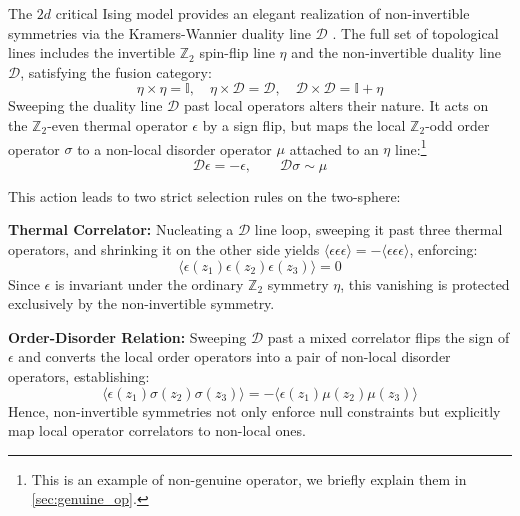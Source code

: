 \documentclass[aps,preprint,nofootinbib,preprintnumbers,eqsecnum,superscriptaddress]{revtex4}
\numberwithin{equation}{section}
\begin{document}
\begin{tcolorbox}[colback=green!5!white, colframe=green!75!black, title={Example: The $2d$ Critical Ising Model and Selection Rules}]
The $2d$ critical Ising model provides an elegant realization of non-invertible symmetries via the Kramers-Wannier duality line $\mathcal{D}$ \cite{shao2024whatsundonetasilectures}. The full set of topological lines includes the invertible $\mathbb{Z}_2$ spin-flip line $\eta$ and the non-invertible duality line $\mathcal{D}$, satisfying the fusion category:
\begin{equation}
    \eta \times \eta = \mathbb{I}, \quad \eta \times \mathcal{D} = \mathcal{D}, \quad \mathcal{D} \times \mathcal{D} = \mathbb{I} + \eta
\end{equation}
Sweeping the duality line $\mathcal{D}$ past local operators alters their nature. It acts on the $\mathbb{Z}_2$-even thermal operator $\epsilon$ by a sign flip, but maps the local $\mathbb{Z}_2$-odd order operator $\sigma$ to a non-local disorder operator $\mu$ attached to an $\eta$ line:\footnote{This is an example of non-genuine operator, we briefly explain them in \ref{sec:genuine_op}.}
\begin{equation}
    \mathcal{D}\epsilon = -\epsilon, \qquad \mathcal{D}\sigma \sim \mu
\end{equation}

This action leads to two strict selection rules on the two-sphere:

{\bf Thermal Correlator:} Nucleating a $\mathcal{D}$ line loop, sweeping it past three thermal operators, and shrinking it on the other side yields $\langle\epsilon\epsilon\epsilon\rangle = -\langle\epsilon\epsilon\epsilon\rangle$, enforcing:
    \begin{equation}
        \langle \epsilon(z_1) \epsilon(z_2) \epsilon(z_3) \rangle = 0
    \end{equation}
    Since $\epsilon$ is invariant under the ordinary $\mathbb{Z}_2$ symmetry $\eta$, this vanishing is protected exclusively by the non-invertible symmetry.
    
{\bf Order-Disorder Relation:} Sweeping $\mathcal{D}$ past a mixed correlator flips the sign of $\epsilon$ and converts the local order operators into a pair of non-local disorder operators, establishing:
    \begin{equation}
        \langle \epsilon(z_1) \sigma(z_2) \sigma(z_3) \rangle = -\langle \epsilon(z_1) \mu(z_2) \mu(z_3) \rangle
    \end{equation}
Hence, non-invertible symmetries not only enforce null constraints but explicitly map local operator correlators to non-local ones.
\end{tcolorbox}
\end{document}

